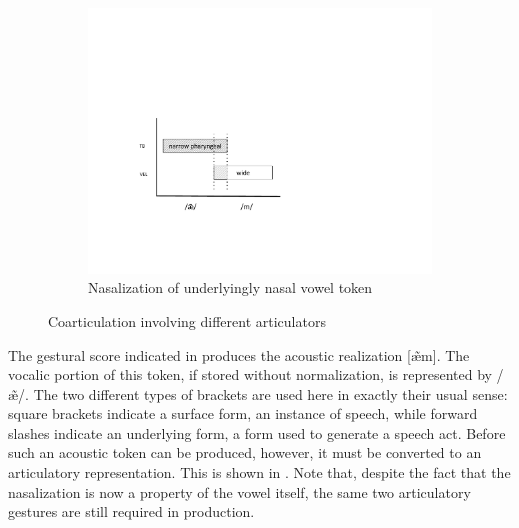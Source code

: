 \begin{figure}[H]
\begin{subfigure}[t]{.3\textwidth}
        \includegraphics[width=\linewidth]{figures/nasalization3.pdf}
        \caption{\label{fig:extra nasalization}Nasalization of underlyingly nasal vowel token}
    \end{subfigure}
    

\caption{\label{fig:Coarticulation}Coarticulation involving different articulators}
\end{figure}

The gestural score indicated in 
produces the acoustic realization {[æ̃m]}. The vocalic
portion of this token, if stored without normalization, is represented
by {/æ̃/}. The two different types of brackets are used
here in exactly their usual sense: square brackets indicate a surface
form, an instance of speech, while forward slashes indicate an underlying
form, a form used to generate a speech act. Before such an acoustic
token can be produced, however, it must be converted to an articulatory
representation. This is shown in .
Note that, despite the fact that the nasalization is now a property
of the vowel itself, the same two articulatory gestures are still
required in production.

